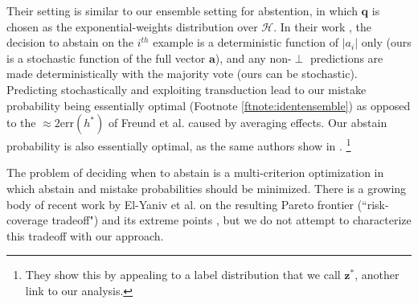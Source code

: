 \documentclass{article}[12pt]
\theoremstyle{named}
\newcommand{\va}{\mathbf{a}}
\newcommand{\vp}{\mathbf{p}}
\newcommand{\vq}{\mathbf{q}}
\newcommand{\vr}{\mathbf{r}}
\newcommand{\vz}{\mathbf{z}}
\newcommand{\abs}[1]{\left| #1 \right|}
\newcommand{\err}[1]{\mbox{err}\left(#1\right)}
\newcommand*{\qedinpw}{\hfill\ensuremath{\square}} %
\newcommand{\cH}{\mathcal{H}}
\newcommand{\lrp}[1]{\left(#1\right)}
\begin{document}
Their setting is similar to our ensemble setting for abstention, 
in which $\vq$ is chosen as the exponential-weights distribution over $\cH$. 
In their work \cite{FMS04}, 
the decision to abstain on the $i^{th}$ example is a deterministic function of $\abs{a_i}$ only 
(ours is a stochastic function of the full vector $\va$), 
and any non-$\perp$ predictions are made deterministically with the majority vote (ours can be stochastic). 
Predicting stochastically and exploiting transduction lead to our mistake probability being essentially optimal 
(Footnote \ref{ftnote:identensemble}) 
as opposed to the $\approx 2 \err{h^*}$ of Freund et al. \cite{FMS04} caused by averaging effects. 
Our abstain probability is also essentially optimal, as the same authors show in \cite{FMS00}.
\footnote{They show this by appealing to a label distribution that we call $\vz^*$, another link to our analysis.}

The problem of deciding when to abstain is a multi-criterion optimization 
in which abstain and mistake probabilities should be minimized. 
There is a growing body of recent work by El-Yaniv et al. on the resulting Pareto frontier (``risk-coverage tradeoff")
and its extreme points \cite{EYW11, EYW12}, 
but we do not attempt to characterize this tradeoff with our approach.


%



\end{document}
